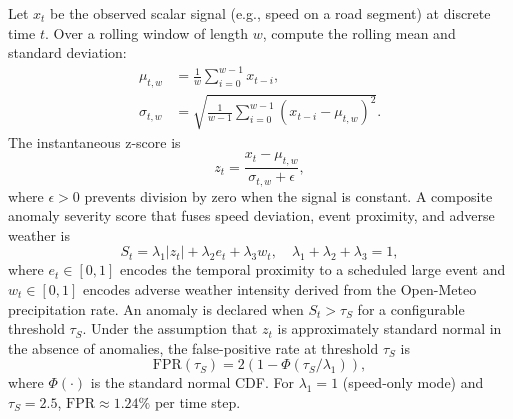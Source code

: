 Let $x_t$ be the observed scalar signal (e.g., speed on a road segment)
at discrete time $t$.
Over a rolling window of length $w$, compute the rolling mean and standard
deviation:
\begin{align}
  \mu_{t,w}    &= \frac{1}{w}\sum_{i=0}^{w-1} x_{t-i},
                 \label{eq:roll_mean} \\
  \sigma_{t,w} &= \sqrt{\frac{1}{w-1}\sum_{i=0}^{w-1}
                   (x_{t-i}-\mu_{t,w})^2}.
                 \label{eq:roll_std}
\end{align}
The instantaneous z-score is
\begin{equation}
  z_t = \frac{x_t - \mu_{t,w}}{\sigma_{t,w} + \epsilon},
  \label{eq:zscore_anomaly}
\end{equation}
where $\epsilon > 0$ prevents division by zero when the signal is constant.
A composite anomaly severity score that fuses speed deviation, event
proximity, and adverse weather is
\begin{equation}
  S_t = \lambda_1 |z_t| + \lambda_2 e_t + \lambda_3 w_t,
  \quad \lambda_1 + \lambda_2 + \lambda_3 = 1,
  \label{eq:anomaly_severity}
\end{equation}
where $e_t \in [0,1]$ encodes the temporal proximity to a scheduled large
event and $w_t \in [0,1]$ encodes adverse weather intensity derived from
the Open-Meteo precipitation rate.
An anomaly is declared when $S_t > \tau_S$ for a configurable threshold
$\tau_S$.
Under the assumption that $z_t$ is approximately standard normal in the
absence of anomalies, the false-positive rate at threshold $\tau_S$ is
\begin{equation}
  \mathrm{FPR}(\tau_S) = 2\left(1 - \Phi(\tau_S / \lambda_1)\right),
  \label{eq:fpr}
\end{equation}
where $\Phi(\cdot)$ is the standard normal CDF.
For $\lambda_1 = 1$ (speed-only mode) and $\tau_S = 2.5$,
$\mathrm{FPR} \approx 1.24\%$ per time step.
